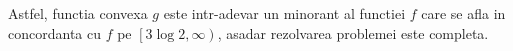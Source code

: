 \documentclass[a4paper,12pt,oneside]{report}
\begin{document}
Astfel, functia convexa \(g\) este intr-adevar un minorant al functiei \(f\) care se afla in concordanta cu \(f\) pe \(\left [ 3\log 2 , \infty  \right )\), asadar rezolvarea problemei este completa. 


















\setlength{\baselineskip}{\normalbaselineskip}
\setlength{\parskip}{0pt}

\end{document}
